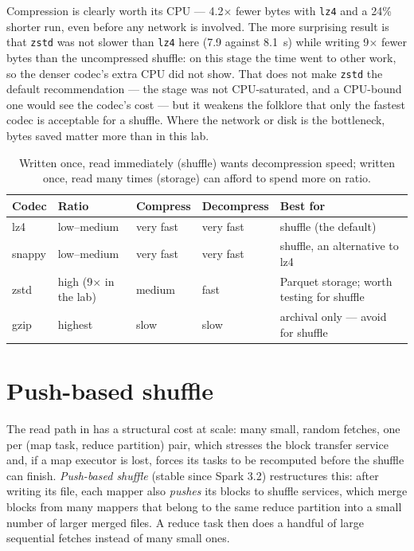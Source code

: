 Compression is clearly worth its CPU --- 4.2$\times$ fewer bytes with \texttt{lz4}
and a 24\% shorter run, even before any network is involved. The more surprising
result is that \texttt{zstd} was not slower than \texttt{lz4} here (7.9 against
8.1~s) while writing 9$\times$ fewer bytes than the uncompressed shuffle: on this
stage the time went to other work, so the denser codec's extra CPU did not show.
That does not make \texttt{zstd} the default recommendation --- the stage was not
CPU-saturated, and a CPU-bound one would see the codec's cost --- but it weakens the
folklore that only the fastest codec is acceptable for a shuffle. Where the
network or disk is the bottleneck, bytes saved matter more than in this lab.

\begin{table}[H]
\centering\footnotesize
\renewcommand{\arraystretch}{1.2}
\begin{tabular}{@{}P{1.6cm}P{2.6cm}P{2.6cm}P{2.6cm}P{3.6cm}@{}}
\toprule
\textbf{Codec} & \textbf{Ratio} & \textbf{Compress} & \textbf{Decompress} & \textbf{Best for} \\
\midrule
lz4 & low--medium & very fast & very fast & shuffle (the default) \\
snappy & low--medium & very fast & very fast & shuffle, an alternative to lz4 \\
zstd & high (9$\times$ in the lab) & medium & fast & Parquet storage; worth testing for shuffle \\
gzip & highest & slow & slow & archival only --- avoid for shuffle \\
\bottomrule
\end{tabular}
\caption{Written once, read immediately (shuffle) wants decompression speed;
written once, read many times (storage) can afford to spend more on ratio.}
\end{table}

\section{Push-based shuffle}
\label{sec:shuffle-push}

The read path in  has a structural cost at scale: many
small, random fetches, one per (map task, reduce partition) pair, which stresses
the block transfer service and, if a map executor is lost, forces its tasks to
be recomputed before the shuffle can finish. \emph{Push-based shuffle}
(stable since Spark 3.2) restructures this: after writing its file, each
mapper also \emph{pushes} its blocks to shuffle services, which merge blocks
from many mappers that belong to the same reduce partition into a small number
of larger merged files. A reduce task then does a handful of large sequential
fetches instead of many small ones.

